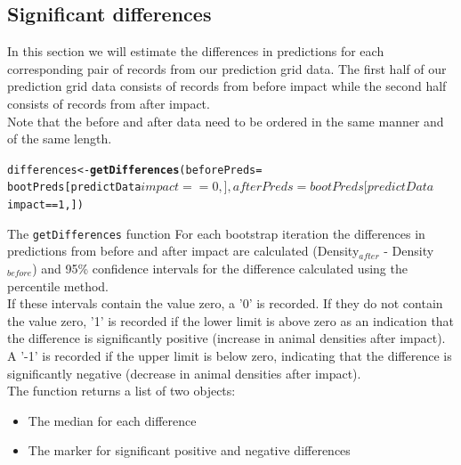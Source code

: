 \documentclass[11pt, a4paper]{article}
\makeatletter
\newcommand{\hlfunctioncall}[1]{\textcolor[rgb]{0.501960784313725,0,0.329411764705882}{\textbf{#1}}}%
\newenvironment{kframe}{%
 \def\at@end@of@kframe{}%
 \ifinner\ifhmode%
  \def\at@end@of@kframe{\end{minipage}}%
  \begin{minipage}{\columnwidth}%
 \fi\fi%
 \def\FrameCommand##1{\hskip\@totalleftmargin \hskip-\fboxsep
 \colorbox{shadecolor}{##1}\hskip-\fboxsep
     \hskip-\linewidth \hskip-\@totalleftmargin \hskip\columnwidth}%
 \MakeFramed {\advance\hsize-\width
   \@totalleftmargin\z@ \linewidth\hsize
   \@setminipage}}%
 {\par\unskip\endMakeFramed%
 \at@end@of@kframe}
\newenvironment{knitrout}{}{} %
\makeatother
\begin{document}
\subsection{Significant differences}
\noindent In this section we will estimate the differences in predictions for each corresponding pair of records from our prediction grid data. The first half of our prediction grid data consists of records from before impact while the second half consists of records from after impact. \\
Note that the before and after data need to be ordered in the same manner and of the same length. 
\begin{knitrout}\footnotesize
{}\color{fgcolor}\begin{kframe}
\begin{alltt}
differences <- \hlfunctioncall{getDifferences}(beforePreds = 
        bootPreds[predictData$impact == 0, ], 
        afterPreds = bootPreds[predictData$impact == 1, ])
\end{alltt}
\end{kframe}
\end{knitrout}
\begin{block}{The {\tt getDifferences} function}
For each bootstrap iteration the differences in predictions from before and after impact are calculated (Density$_{after}$ - Density$_{before}$) and 95\% confidence intervals for the difference calculated using the percentile method. \\
If these intervals contain the value zero, a '0' is recorded. If they do not contain the value zero, '1' is recorded if the lower limit is above zero as an indication that the difference is significantly positive (increase in animal densities after impact). A '-1' is recorded if the upper limit is below zero, indicating that the difference is significantly negative (decrease in animal densities after impact). \\
The function returns a list of two objects: 
\begin{itemize}
\item{The median for each difference}
\item{The marker for significant positive and negative differences}
\end{itemize}
\end{block}
\end{document}
